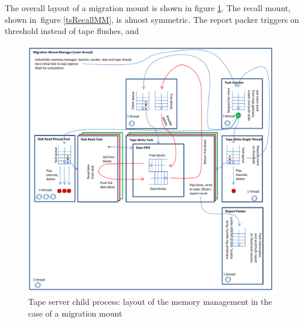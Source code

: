 The overall layout of a migration mount is shown in figure \ref{tsMigrationMM}. The recall mount, shown in\
figure \ref{tsRecallMM}, is almost symmetric. The report packer triggers on threshold instead of tape 
flushes, and 

\begin{figure}[h]
\begin{center}
\includegraphics[scale=0.75]{images/MigrationMountMM}
\end{center}
\caption{\label{tsMigrationMM}Tape server child process: layout of the memory management in the case
of a migration mount}
\end{figure}

